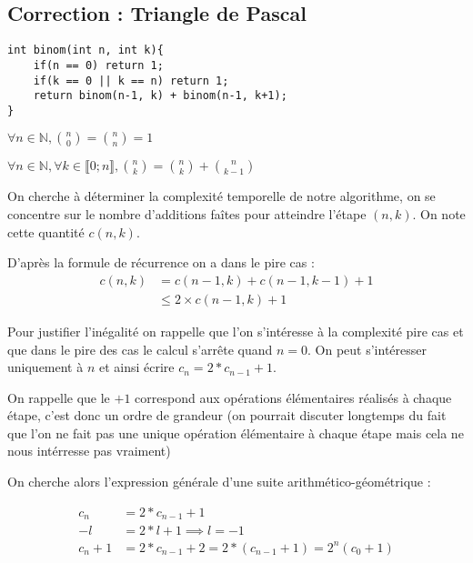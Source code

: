 \documentclass{article}
\begin{document}
\subsection*{Correction : Triangle de Pascal}
\begin{enumerate}
    \item {
\begin{verbatim}
int binom(int n, int k){
    if(n == 0) return 1;
    if(k == 0 || k == n) return 1;
    return binom(n-1, k) + binom(n-1, k+1);
}
\end{verbatim}
    }
    \item $\forall n \in \mathbb{N}, \binom{n}{0} = \binom{n}{n} = 1$
    \item $\forall n \in \mathbb{N}, \forall k \in \llbracket 0; n \rrbracket, \binom{n}{k} = \binom{n}{k} + \binom{n}{k-1}$
    \item {
    \item {
    On cherche à déterminer la complexité temporelle de notre algorithme, on se concentre sur le nombre d'additions faîtes pour atteindre l'étape $(n, k)$. On note cette quantité $c(n, k)$.

    D'après la formule de récurrence on a dans le pire cas :
    \begin{equation*} \label{}
    \begin{split}
        c(n, k) & = c(n-1, k) + c(n-1, k-1) + 1 \\
                & \leq 2 \times c(n-1, k) + 1
    \end{split}
    \end{equation*}

    Pour justifier l'inégalité on rappelle que l'on s'intéresse à la complexité pire cas et que dans le pire des cas le calcul s'arrête quand $n = 0$. On peut s'intéresser uniquement à $n$ et ainsi écrire $c_n = 2 * c_{n-1} + 1$.

    On rappelle que le $+1$ correspond aux opérations élémentaires réalisés à chaque étape, c'est donc un ordre de grandeur (on pourrait discuter longtemps du fait que l'on ne fait pas une unique opération élémentaire à chaque étape mais cela ne nous intérresse pas vraiment)

    On cherche alors l'expression générale d'une suite arithmético-géométrique : 
    
    \begin{equation*} \label{}
    \begin{split}
      c_n & = 2 * c_{n-1} + 1 \\
      - l & = 2*l + 1 \implies l = -1 \\
      c_n + 1 &= 2*c_{n-1} + 2 = 2*(c_{n-1} + 1) = 2^n (c_0 + 1)
    \end{split}
    \end{equation*}

}}
\end{enumerate}
\end{document}
